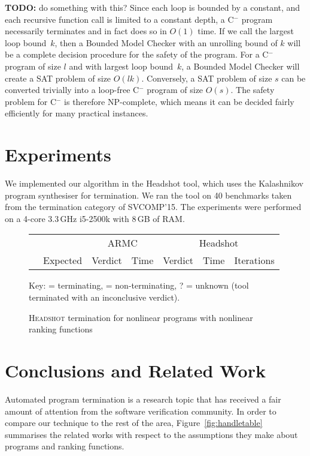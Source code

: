 \documentclass[preprint]{sigplanconf}
\theoremstyle{definition}
\newcommand{\xmark}{\ding{55}}
\newcommand{\tick}{\checkmark}
\newcommand{\todo}[1]{{\bf TODO:} #1}
\newcommand{\newC}{C$^-$\xspace}
\begin{document}
\todo{do something with this?}
Since each loop is bounded by a constant, and each recursive function call is
limited to a constant depth, a \newC program necessarily terminates and in
fact does so in $O(1)$ time.  If we call the largest loop bound~$k$, then
a Bounded Model Checker with an unrolling bound of $k$ will be a complete
decision procedure for the safety of the program.  For a \newC program of
size $l$ and with largest loop bound~$k$, a Bounded Model Checker will
create a SAT problem of size $O(lk)$.  Conversely, a SAT problem
of size $s$ can be converted trivially into a loop-free \newC program
of size $O(s)$.  The safety problem for \newC is therefore NP-complete,
which means it can be decided fairly efficiently for many practical
instances.



\section{Experiments}

We implemented our algorithm in the {\sc Headshot} tool, which uses the {\sc
Kalashnikov} program synthesiser for termination.  We ran the tool on 40
benchmarks taken from the termination category of SVCOMP'15.  The
experiments were performed on a 4-core 3.3\,GHz i5-2500k with 8\,GB of RAM.


\begin{figure*}
\centering
\footnotesize
\begin{tabular}{|l|c||c|r||c|r|r|}
\hline
    &             & \multicolumn{2}{|c||}{\sc ARMC} & \multicolumn{3}{|c|}{\sc Headshot} \\
    & Expected &  Verdict & Time & Verdict & Time & Iterations\\
    \hline
    \hline

    \hline
\end{tabular}

Key: \tick = terminating, \xmark = non-terminating, ? = unknown (tool terminated with an inconclusive verdict).

\caption{\textsc{Headshot} termination for nonlinear programs with nonlinear ranking functions\label{fig:nonlinear}}
 \end{figure*}

 \section{Conclusions and Related Work}
Automated program termination is a research topic that has received a fair amount of attention from the software verification community.
In order to compare our technique to the rest of the area, 
Figure~\ref{fig:handletable} summarises the related works with respect to the assumptions they make about programs and ranking functions. 
\end{document}
